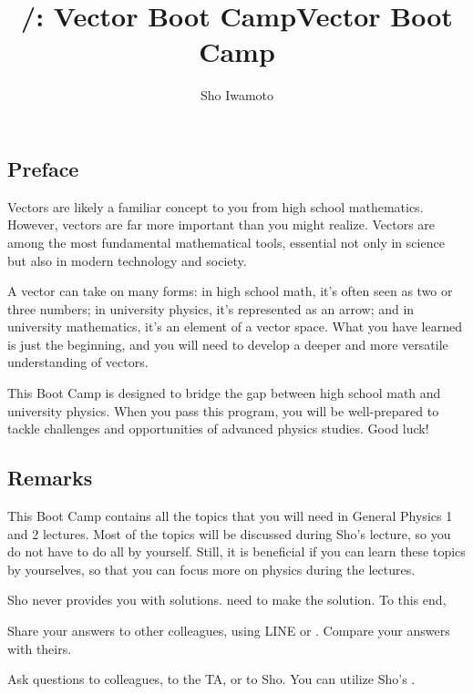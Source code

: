\documentclass[11pt,pdfa,lastpage]{MishoNote}
\title{\LectureName/: Vector Boot Camp}
\author{Sho Iwamoto}
\let\origfootnote\footnote
\let\origfootnoterule\footnoterule
\begin{document}
%
\title{Vector Boot Camp}
\begin{maketitle}
\let\footnote\origfootnote
\let\footnoterule\origfootnoterule

\subsection*{Preface}
Vectors are likely a familiar concept to you from high school mathematics.
However, vectors are far more important than you might realize.
Vectors are among the most fundamental mathematical tools, essential not only in science but also in modern technology and society.

A vector can take on many forms: in high school math, it's often seen as two or three numbers; in university physics, it's represented as an arrow; and in university mathematics, it's an element of a vector space.
What you have learned is just the beginning, and you will need to develop a deeper and more versatile understanding of vectors.

This Boot Camp is designed to bridge the gap between high school math and university physics.
When you pass this program, you will be well-prepared to tackle challenges and opportunities of advanced physics studies.
Good luck!

\subsection*{Remarks}
This Boot Camp contains all the topics that you will need in General Physics 1 and 2 lectures.
Most of the topics will be discussed during Sho's lecture, so you do not have to do all by yourself. Still, it is beneficial if you can learn these topics by yourselves, so that you can focus more on physics during the lectures.

\medskip

Sho never provides you with solutions.  need to make the solution. To this end,
\begin{miniitemize}
  \item Share your answers to other colleagues, using LINE or . Compare your answers with theirs.
  \item Ask questions to colleagues, to the TA, or to Sho. You can utilize Sho's .
\end{miniitemize}


\end{maketitle}
\end{document}
